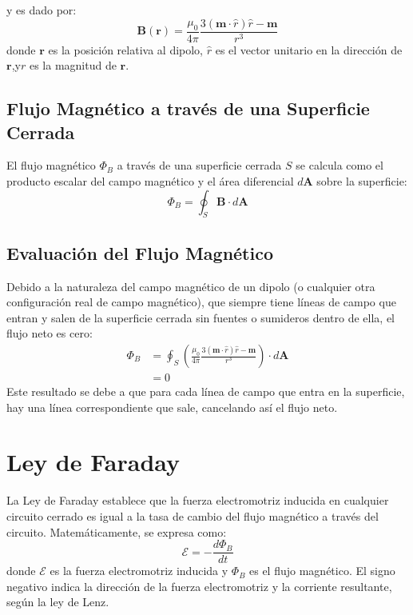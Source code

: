 \documentclass{article}
\begin{document}
 
y es dado por:
\begin{equation}
	\mathbf{B}(\mathbf{r}) = \frac{\mu_0}{4\pi} \frac{3(\mathbf{m} \cdot \hat{r})\hat{r} - \mathbf{m}}{r^3}
\end{equation}
donde \(\mathbf{r}\) es la posición relativa al dipolo, 
	\(\hat{r}\) es el vector unitario en la dirección de \(\mathbf{r}\),y\(r\) es la magnitud de \(\mathbf{r}\).

\subsection{Flujo Magnético a través de una Superficie Cerrada}
El flujo magnético \(\Phi_B\) a través de una superficie cerrada \(S\) se calcula como el producto escalar del campo magnético y el área diferencial \(d\mathbf{A}\) sobre la superficie:
\begin{equation}
	\Phi_B = \oint_S \mathbf{B} \cdot d\mathbf{A}
\end{equation}

\subsection{Evaluación del Flujo Magnético}
Debido a la naturaleza del campo magnético de un dipolo (o cualquier otra configuración real de campo magnético), que siempre tiene líneas de campo que entran y salen de la superficie cerrada sin fuentes o sumideros dentro de ella, el flujo neto es cero:
\begin{align}
	\Phi_B &= \oint_S \left(\frac{\mu_0}{4\pi} \frac{3(\mathbf{m} \cdot \hat{r})\hat{r} - \mathbf{m}}{r^3}\right) \cdot d\mathbf{A} \\
	&= 0
\end{align}
Este resultado se debe a que para cada línea de campo que entra en la superficie, hay una línea correspondiente que sale, cancelando así el flujo neto.

\section{Ley de Faraday}
La Ley de Faraday establece que la fuerza electromotriz inducida en cualquier circuito cerrado es igual a la tasa de cambio del flujo magnético a través del circuito. Matemáticamente, se expresa como:
\begin{equation}
	\mathcal{E} = -\frac{d\Phi_B}{dt}
\end{equation}
donde \(\mathcal{E}\) es la fuerza electromotriz inducida y \(\Phi_B\) es el flujo magnético. El signo negativo indica la dirección de la fuerza electromotriz y la corriente resultante, según la ley de Lenz.
\end{document}
